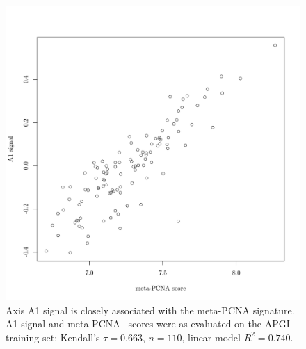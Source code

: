 \documentclass[dissertation.tex]{subfiles}
\begin{document}
\begin{figure}
\centering
\includegraphics[width=.7\linewidth]{analysis/biosurv/reports/18_SIS_diag_dsd_final/figure/nmf-msigdb-cor-plots-5}
\caption[A1 signal is closely associated with meta-PCNA score]{Axis A1 signal is closely associated with the meta-PCNA signature.  A1 signal and meta-PCNA~\cite{Venet2011} scores were as evaluated on the \acrshort{APGI} training set; Kendall's $\tau = 0.663$, $n = 110$, linear model $R^2 = 0.740$.}\label{fig:sigs-axis1-pcna}
\end{figure}
\end{document}
